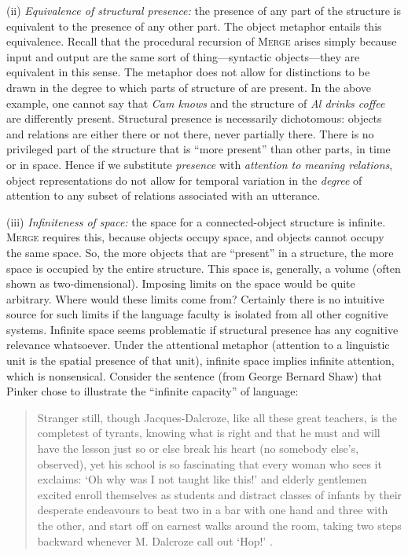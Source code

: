 (ii) \textit{Equivalence of structural presence:} the presence of any part of the structure is equivalent to the presence of any other part. The object metaphor entails this equivalence. Recall that the procedural recursion of \textsc{Merge} arises simply because input and output are the same sort of thing—syntactic objects—they are equivalent in this sense. The metaphor does not allow for distinctions to be drawn in the degree to which parts of structure of are present. In the above example, one cannot say that \textit{Cam knows} and the structure of \textit{Al drinks coffee} are differently present. Structural presence is necessarily dichotomous: objects and relations are either there or not there, never partially there. There is no privileged part of the structure that is “more present” than other parts, in time or in space. Hence if we substitute \textit{presence} with \textit{attention to meaning relations}, object representations do not allow for temporal variation in the \textit{degree} of attention to any subset of relations associated with an utterance. 

(iii) \textit{Infiniteness of space:} the space for a connected-object structure is infinite. \textsc{Merge} requires this, because objects occupy space, and objects cannot occupy the same space. So, the more objects that are “present” in a structure, the more space is occupied by the entire structure. This space is, generally, a volume (often shown as two-dimensional). Imposing limits on the space would be quite arbitrary. Where would these limits come from? Certainly there is no intuitive source for such limits if the language faculty is isolated from all other cognitive systems. Infinite space seems problematic if structural presence has any cognitive relevance whatsoever. Under the attentional metaphor (attention to a linguistic unit is the spatial presence of that unit), infinite space implies infinite attention, which is nonsensical. Consider the sentence (from George Bernard Shaw) that Pinker chose to illustrate the “infinite capacity” of language:

\begin{quote}
Stranger still, though Jacques-Dalcroze, like all these great teachers, is the completest of tyrants, knowing what is right and that he must and will have the lesson just so or else break his heart (no somebody else’s, observed), yet his school is so fascinating that every woman who sees it exclaims: ‘Oh why was I not taught like this!’ and elderly gentlemen excited enroll themselves as students and distract classes of infants by their desperate endeavours to beat two in a bar with one hand and three with the other, and start off on earnest walks around the room, taking two steps backward whenever M. Dalcroze call out ‘Hop!’ \citep{Pinker2003}.
\end{quote}

